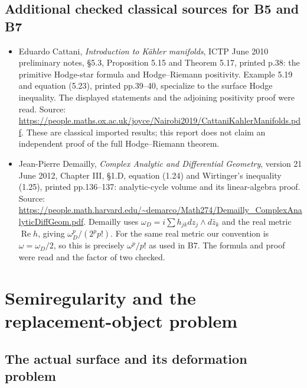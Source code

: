 \documentclass[11pt,a4paper]{article}
\providecommand{\tightlist}{\setlength{\itemsep}{0pt}\setlength{\parskip}{0pt}}
\theoremstyle{definition}
\begin{document}
\subsection{Additional checked classical sources for B5 and B7}\label{additional-checked-classical-sources-for-b5-and-b7}

\begin{itemize}
\tightlist
\item
  Eduardo Cattani, \emph{Introduction to Kähler manifolds}, ICTP June 2010 preliminary notes, §5.3, Proposition 5.15 and Theorem 5.17, printed p.38: the primitive Hodge-star formula and Hodge--Riemann positivity. Example 5.19 and equation (5.23), printed pp.39--40, specialize to the surface Hodge inequality. The displayed statements and the adjoining positivity proof were read. Source: \url{https://people.maths.ox.ac.uk/joyce/Nairobi2019/CattaniKahlerManifolds.pdf}. These are classical imported results; this report does not claim an independent proof of the full Hodge--Riemann theorem.
\item
  Jean-Pierre Demailly, \emph{Complex Analytic and Differential Geometry}, version 21 June 2012, Chapter III, §1.D, equation (1.24) and Wirtinger's inequality (1.25), printed pp.136--137: analytic-cycle volume and its linear-algebra proof. Source: \url{https://people.math.harvard.edu/~demarco/Math274/Demailly_ComplexAnalyticDiffGeom.pdf}. Demailly uses \(\omega_D=i\sum h_{jk}dz_j\wedge d\bar z_k\) and the real metric \(\operatorname{Re}h\), giving \(\omega_D^p/(2^p p!)\). For the same real metric our convention is \(\omega=\omega_D/2\), so this is precisely \(\omega^p/p!\) as used in B7. The formula and proof were read and the factor of two checked.
\end{itemize}

\section{Semiregularity and the replacement-object problem}


\subsection{The actual surface and its deformation problem}
\end{document}
